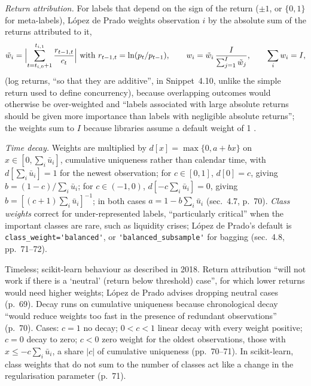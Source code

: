\begin{qfmethod}\label{meth:sample-weights-attribution-decay}
 \emph{Return attribution.} For labels that depend on the sign of the return ($\pm1$, or $\{0,1\}$ for meta-labels), López de Prado weights observation $i$ by the absolute sum of the returns attributed to it,
\[ \tilde w_i=\Bigl|\sum_{t=t_{i,0}+1}^{t_{i,1}}\frac{r_{t-1,t}}{c_t}\Bigr|\ \text{with}\ r_{t-1,t}=\ln(p_t/p_{t-1}),\qquad w_i=\tilde w_i\,\frac{I}{\sum_{j=1}^I\tilde w_j},\qquad \sum_iw_i=I, \]
(log returns, ``so that they are additive'', in Snippet~4.10, unlike the simple return used to define concurrency), because overlapping outcomes would otherwise be over-weighted and ``labels associated with large absolute returns should be given more importance than labels with negligible absolute returns''; the weights sum to $I$ because libraries assume a default weight of 1 \citep[chap.~4, sec.~4.6, pp.~68--69, Snippet~4.10]{alpha-afml}.

\emph{Time decay.} Weights are multiplied by $d[x]=\max\{0,a+bx\}$ on $x\in[0,\sum_i\bar u_i]$, cumulative uniqueness rather than calendar time, with $d[\sum_i\bar u_i]=1$ for the newest observation; for $c\in[0,1]$, $d[0]=c$, giving $b=(1-c)/\sum_i\bar u_i$; for $c\in(-1,0)$, $d[-c\sum_i\bar u_i]=0$, giving $b=[(c+1)\sum_i\bar u_i]^{-1}$; in both cases $a=1-b\sum_i\bar u_i$ (sec.~4.7, p.~70). \emph{Class weights} correct for under-represented labels, ``particularly critical'' when the important classes are rare, such as liquidity crises; López de Prado's default is \nolinkurl{class_weight='balanced'}, or \nolinkurl{'balanced_subsample'} for bagging (sec.~4.8, pp.~71--72).

 Timeless; scikit-learn behaviour as described in 2018. Return attribution ``will not work if there is a `neutral' (return below threshold) case'', for which lower returns would need higher weights; López de Prado advises dropping neutral cases (p.~69). Decay runs on cumulative uniqueness because chronological decay ``would reduce weights too fast in the presence of redundant observations'' (p.~70). Cases: $c=1$ no decay; $0<c<1$ linear decay with every weight positive; $c=0$ decay to zero; $c<0$ zero weight for the oldest observations, those with $x\le-c\sum_i\bar u_i$, a share $|c|$ of cumulative uniqueness (pp.~70--71). In scikit-learn, class weights that do not sum to the number of classes act like a change in the regularisation parameter (p.~71).


\end{qfmethod}

